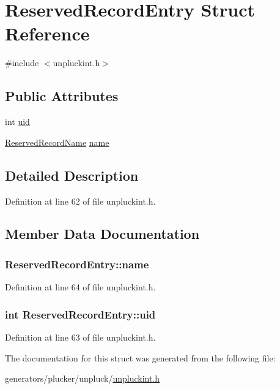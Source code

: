 \hypertarget{structReservedRecordEntry}{\section{Reserved\+Record\+Entry Struct Reference}
\label{structReservedRecordEntry}
}


{\ttfamily \#include $<$unpluckint.\+h$>$}

\subsection*{Public Attributes}
\begin{DoxyCompactItemize}
\item 
int \hyperlink{structReservedRecordEntry_a584205e972ca4b5f9c25b4f38eb04eae}{uid}
\item 
\hyperlink{unpluckint_8h_acd51e45c8e2b63cd1e42d5dda69c1d08}{Reserved\+Record\+Name} \hyperlink{structReservedRecordEntry_a7f036e9a8868e13e35b3932178dcee00}{name}
\end{DoxyCompactItemize}


\subsection{Detailed Description}


Definition at line 62 of file unpluckint.\+h.



\subsection{Member Data Documentation}
\hypertarget{structReservedRecordEntry_a7f036e9a8868e13e35b3932178dcee00}{
\subsubsection[{name}]{ Reserved\+Record\+Entry\+::name}}\label{structReservedRecordEntry_a7f036e9a8868e13e35b3932178dcee00}


Definition at line 64 of file unpluckint.\+h.

\hypertarget{structReservedRecordEntry_a584205e972ca4b5f9c25b4f38eb04eae}{
\subsubsection[{uid}]{\setlength{\rightskip}{0pt plus 5cm}int Reserved\+Record\+Entry\+::uid}}\label{structReservedRecordEntry_a584205e972ca4b5f9c25b4f38eb04eae}


Definition at line 63 of file unpluckint.\+h.



The documentation for this struct was generated from the following file\+:\begin{DoxyCompactItemize}
\item 
generators/plucker/unpluck/\hyperlink{unpluckint_8h}{unpluckint.\+h}\end{DoxyCompactItemize}
